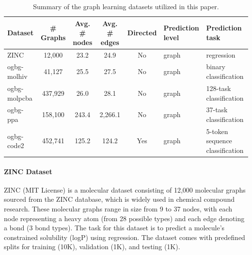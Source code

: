 \documentclass{acmart}
\begin{document}
\begin{table}[htbp]
\centering
\caption{Summary of the graph learning datasets utilized in this paper.}
\begin{tabular}{|l|c|c|c|c|l|l|} 
\hline
\textbf{Dataset}      & \textbf{\# Graphs} & \textbf{Avg. \# nodes} & \textbf{Avg. \# edges} & \textbf{Directed} & \textbf{Prediction level} & \textbf{Prediction task}        \\ \hline
ZINC                  & 12,000             & 23.2                  & 24.9                  & No                & graph                     & regression                    \\ \hline
ogbg-molhiv           & 41,127             & 25.5                  & 27.5                  & No                & graph                     & binary classification          \\ \hline
ogbg-molpcba          & 437,929            & 26.0                  & 28.1                  & No                & graph                     & 128-task classification        \\ \hline
ogbg-ppa              & 158,100            & 243.4                 & 2,266.1               & No                & graph                     & 37-task classification         \\ \hline
ogbg-code2            & 452,741            & 125.2                 & 124.2                 & Yes               & graph                     & 5-token sequence classification \\ \hline
\end{tabular}
\label{tab:dataset_overview}
\end{table}




\paragraph{ZINC Dataset \cite{dwivedi2022benchmarkinggraphneuralnetworks}}
ZINC (MIT License) is a molecular dataset consisting of 12,000 molecular graphs sourced from the ZINC database, which is widely used in chemical compound research. These molecular graphs range in size from 9 to 37 nodes, with each node representing a heavy atom (from 28 possible types) and each edge denoting a bond (3 bond types). The task for this dataset is to predict a molecule’s constrained solubility (logP) using regression. The dataset comes with predefined splits for training (10K), validation (1K), and testing (1K).
\end{document}
